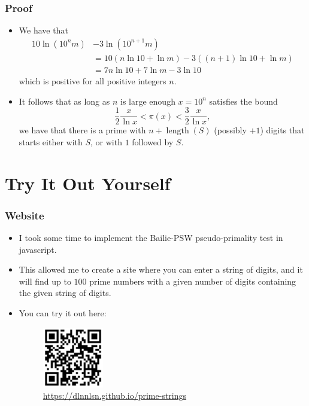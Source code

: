\documentclass{beamer}
\begin{document}
\begin{frame}
    \frametitle{Proof}

    \begin{itemize}
        \item We have that
        \begin{align*}
            10 \ln\left( 10^n m \right) & - 3 \ln\left( 10^{n + 1} m \right) \\
            & = 10\left( n \ln 10 + \ln m \right) - 3\left( (n + 1) \ln 10  + \ln m \right) \\
            & = 7n \ln 10 + 7 \ln m - 3 \ln 10
        \end{align*}
        which is positive for all positive integers $n$. \pause
        \item It follows that as long as $n$ is large enough $x = 10^n$ satisfies the bound
        \[
            \frac{1}{2} \frac{x}{\ln x} < \pi(x) < \frac{3}{2} \frac{x}{\ln x},
        \]
        we have that there is a prime with $n + \operatorname{length}(S)$ (possibly $+ 1$) digits that starts either with $S$, or with $1$ followed by $S$.
    \end{itemize} 

\end{frame}

\section{Try It Out Yourself}

\begin{frame}
    \frametitle{Website}

    \begin{itemize}
        \item I took some time to implement the Bailie-PSW pseudo-primality test in javascript. \pause
        \item This allowed me to create a site where you can enter a string of digits, and it will find up to $100$ prime numbers with a given number of digits containing the given string of digits. \pause
        \item You can try it out here:
        \begin{figure}
            \centering
            \includegraphics[width=0.25\textwidth]{prime_strings.png}
            \caption{\url{https://dlnnlsn.github.io/prime-strings}}
        \end{figure}
    \end{itemize} 

\end{frame}
\end{document}

